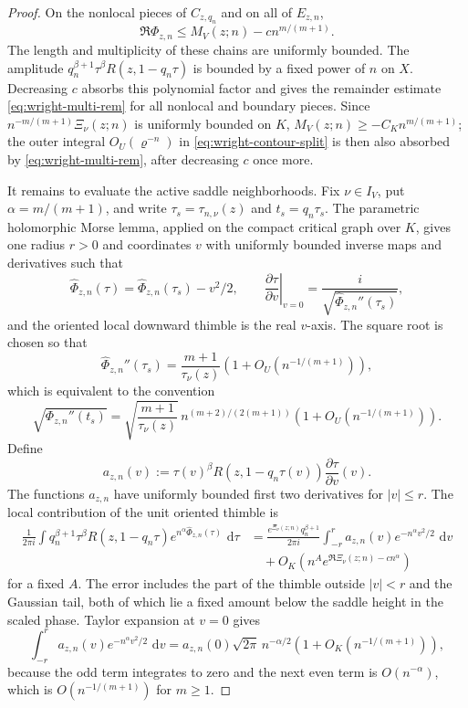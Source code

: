 \documentclass[reqno]{article}
\theoremstyle{definition}
\theoremstyle{remark}
\theoremstyle{plain}
\newcommand{\dd}{\,\mathrm d}
\begin{document}
\begin{proof}
On the nonlocal pieces of $C_{z,q_n}$ and on all of $E_{z,n}$,
$$\Re\Phi_{z,n}\le M_V(z;n)-c n^{m/(m+1)}.$$
The length and multiplicity of these chains are uniformly bounded. The amplitude $q_n^{\beta+1}\tau^\beta R(z,1-q_n\tau)$ is bounded by a fixed power of $n$ on $X$. Decreasing $c$ absorbs this polynomial factor and gives the remainder estimate \eqref{eq:wright-multi-rem} for all nonlocal and boundary pieces. Since $n^{-m/(m+1)}\Xi_\nu(z;n)$ is uniformly bounded on $K$, $M_V(z;n)\ge -C_Kn^{m/(m+1)}$; the outer integral $O_U(\varrho^{-n})$ in \eqref{eq:wright-contour-split} is then also absorbed by \eqref{eq:wright-multi-rem}, after decreasing $c$ once more.

It remains to evaluate the active saddle neighborhoods. Fix $\nu\in I_V$, put $\alpha=m/(m+1)$, and write $\tau_s=\tau_{n,\nu}(z)$ and $t_s=q_n\tau_s$. The parametric holomorphic Morse lemma, applied on the compact critical graph over $K$, gives one radius $r>0$ and coordinates $v$ with uniformly bounded inverse maps and derivatives such that
$$\widehat\Phi_{z,n}(\tau)=\widehat\Phi_{z,n}(\tau_s)-v^2/2,
\qquad
\left.\frac{\partial\tau}{\partial v}\right|_{v=0}=\frac{i}{\sqrt{\widehat\Phi_{z,n}''(\tau_s)}},$$
and the oriented local downward thimble is the real $v$-axis. The square root is chosen so that
$$\widehat\Phi_{z,n}''(\tau_s)=\frac{m+1}{\tau_\nu(z)}\left(1+O_U\!\left(n^{-1/(m+1)}\right)\right),$$
which is equivalent to the convention
$$\sqrt{\Phi_{z,n}''(t_s)}=
\sqrt{\frac{m+1}{\tau_\nu(z)}}\,n^{(m+2)/(2(m+1))}
\left(1+O_U\!\left(n^{-1/(m+1)}\right)\right).$$
Define
$$a_{z,n}(v):=\tau(v)^\beta R(z,1-q_n\tau(v))\frac{\partial\tau}{\partial v}(v).$$
The functions $a_{z,n}$ have uniformly bounded first two derivatives for $|v|\le r$. The local contribution of the unit oriented thimble is
\begin{align*}
\frac{1}{2\pi i}\int q_n^{\beta+1}\tau^\beta R(z,1-q_n\tau)
 e^{n^\alpha\widehat\Phi_{z,n}(\tau)}\,\dd\tau
&=\frac{e^{\Xi_\nu(z;n)}q_n^{\beta+1}}{2\pi i}
\int_{-r}^r a_{z,n}(v)e^{-n^\alpha v^2/2}\,\dd v\\
&\quad +O_K\!\left(n^A e^{\Re\Xi_\nu(z;n)-c n^\alpha}\right)
\end{align*}
for a fixed $A$. The error includes the part of the thimble outside $|v|<r$ and the Gaussian tail, both of which lie a fixed amount below the saddle height in the scaled phase. Taylor expansion at $v=0$ gives
$$\int_{-r}^r a_{z,n}(v)e^{-n^\alpha v^2/2}\,\dd v
=a_{z,n}(0)\sqrt{2\pi}\,n^{-\alpha/2}
\left(1+O_K\!\left(n^{-1/(m+1)}\right)\right),$$
because the odd term integrates to zero and the next even term is $O(n^{-\alpha})$, which is $O(n^{-1/(m+1)})$ for $m\ge1$.


\end{proof}
\end{document}
